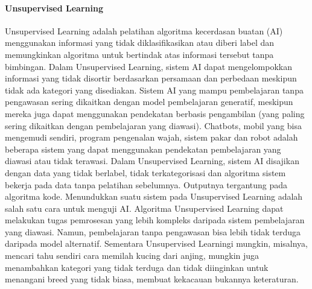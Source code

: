 \paragraph{Unsupervised Learning}\hspace{0pt} \par
Unsupervised Learning adalah pelatihan algoritma kecerdasan buatan (AI) menggunakan informasi yang tidak diklasifikasikan atau diberi label dan memungkinkan algoritma untuk bertindak atas informasi tersebut tanpa bimbingan.
Dalam Unsupervised Learning, sistem AI dapat mengelompokkan informasi yang tidak disortir berdasarkan persamaan dan perbedaan meskipun tidak ada kategori yang disediakan. Sistem AI yang mampu pembelajaran tanpa pengawasan sering dikaitkan dengan model pembelajaran generatif, meskipun mereka juga dapat menggunakan pendekatan berbasis pengambilan (yang paling sering dikaitkan dengan pembelajaran yang diawasi). Chatbots, mobil yang bisa mengemudi sendiri, program pengenalan wajah, sistem pakar dan robot adalah beberapa sistem yang dapat menggunakan pendekatan pembelajaran yang diawasi atau tidak terawasi.
Dalam Unsupervised Learning, sistem AI disajikan dengan data yang tidak berlabel, tidak terkategorisasi dan algoritma sistem bekerja pada data tanpa pelatihan sebelumnya. Outputnya tergantung pada algoritma kode. Menundukkan suatu sistem pada Unsupervised Learning adalah salah satu cara untuk menguji AI.
Algoritma Unsupervised Learning dapat melakukan tugas pemrosesan yang lebih kompleks daripada sistem pembelajaran yang diawasi. Namun, pembelajaran tanpa pengawasan bisa lebih tidak terduga daripada model alternatif. Sementara Unsupervised Learningi mungkin, misalnya, mencari tahu sendiri cara memilah kucing dari anjing, mungkin juga menambahkan kategori yang tidak terduga dan tidak diinginkan untuk menangani breed yang tidak biasa, membuat kekacauan bukannya keteraturan.

